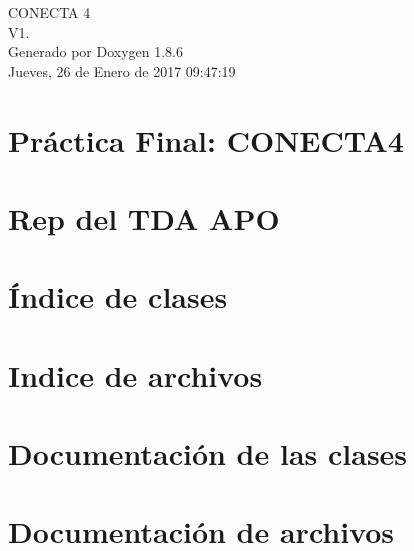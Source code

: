\documentclass[twoside]{article}
\begin{document}
\hypersetup{pageanchor=false}
\begin{titlepage}
\vspace*{7cm}
\begin{center}%
{\Large C\-O\-N\-E\-C\-T\-A 4 \\[1ex]\large V1. }\\
\vspace*{1cm}
{\large Generado por Doxygen 1.8.6}\\
\vspace*{0.5cm}
{\small Jueves, 26 de Enero de 2017 09:47:19}\\
\end{center}
\end{titlepage}
\tableofcontents
{}
\hypersetup{pageanchor=true}

\section{Práctica Final\-: C\-O\-N\-E\-C\-T\-A4}
\label{index}\hypertarget{index}{}
\section{Rep del T\-D\-A A\-P\-O}
\label{repConjunto}
\hypertarget{repConjunto}{}

\section{Índice de clases}

\section{Indice de archivos}

\section{Documentación de las clases}









\section{Documentación de archivos}






\newpage
{}
{}
\printindex
\end{document}
